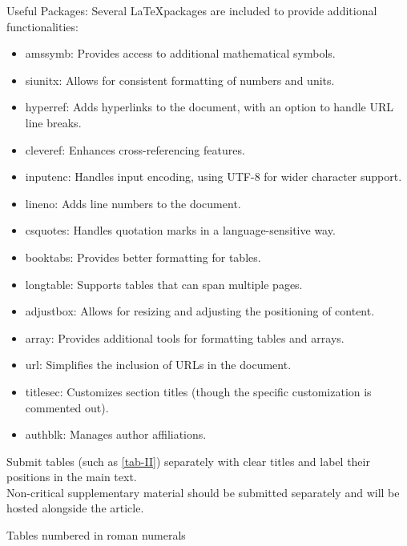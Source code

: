 \documentclass{article}
\begin{document}
Useful Packages:
        Several \LaTeX packages are included to provide additional functionalities:
            \begin{itemize}
                \item amssymb: Provides access to additional mathematical symbols.
                \item siunitx: Allows for consistent formatting of numbers and units.
                \item hyperref: Adds hyperlinks to the document, with an option to handle URL line breaks.
                \item cleveref: Enhances cross-referencing features.
                \item inputenc: Handles input encoding, using UTF-8 for wider character support.
                \item lineno: Adds line numbers to the document.
                \item csquotes: Handles quotation marks in a language-sensitive way.
                \item booktabs: Provides better formatting for tables.
                \item longtable: Supports tables that can span multiple pages.
                \item adjustbox: Allows for resizing and adjusting the positioning of content.
                \item array: Provides additional tools for formatting tables and arrays.
                \item url: Simplifies the inclusion of URLs in the document.
                \item titlesec: Customizes section titles (though the specific customization is commented out).
                \item authblk: Manages author affiliations.
            \end{itemize}


Submit tables (such as \ref{tab-II}) separately with clear titles and label their positions in the main text.\\
Non-critical supplementary material should be submitted separately and will be hosted alongside the article.

\begin{table}[ht]
 \centering
 \caption{Tables numbered in roman numerals}
 \label{tab-II}
\end{table}
\end{document}
